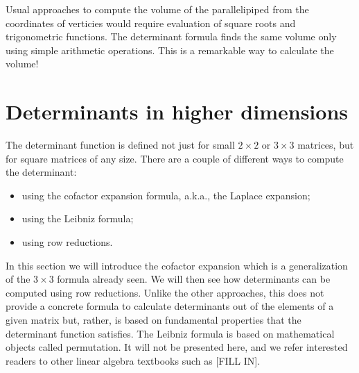 \documentclass{ximera}
\begin{document}
Usual approaches to compute the volume of the parallelipiped from the
coordinates of verticies would require evaluation of square roots and
trigonometric functions. The determinant formula finds the same volume
only using simple arithmetic operations. This is a remarkable way to
calculate the volume!


\section{Determinants in higher dimensions}
The determinant function is defined not just for small
$2 \times 2$ or $3 \times 3$ matrices, but for square matrices of any
size. There are a couple of different ways to compute the determinant:
\begin{itemize}
\item using the cofactor expansion formula, a.k.a., the Laplace expansion;
\item using the Leibniz formula;
\item using row reductions.
\end{itemize}
In this section we will introduce the cofactor expansion which is a
generalization of the $3 \times 3$ formula already seen. We will then see
how determinants can be computed using row reductions. Unlike the
other approaches, this does not provide a concrete formula to
calculate determinants out of the elements of a given matrix but,
rather, is based on fundamental properties that the determinant
function satisfies. The Leibniz formula is based on mathematical
objects called permutation. It will not be presented here, and we
refer interested readers to other linear algebra textbooks such as
[FILL IN].
\end{document}
